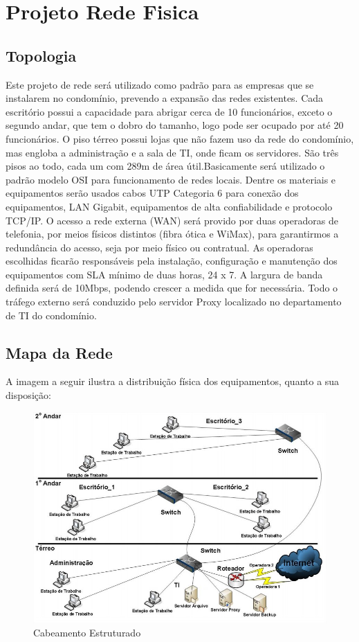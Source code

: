 \documentclass[	DIV=calc,%
							paper=a4,%
							fontsize=12pt,%
							onecolumn]{scrartcl}	 					%
\begin{document}
\section{Projeto Rede Fisica}
\subsection{Topologia}
{\raggedright Este projeto de rede será utilizado como padrão para as empresas que se instalarem no condomínio, prevendo a expansão das redes existentes. Cada escritório possui a capacidade para abrigar cerca de 10 funcionários, exceto o segundo andar, que tem o dobro do tamanho, logo pode ser ocupado por até 20 funcionários. O piso térreo possui lojas que não fazem uso da rede do condomínio, mas engloba a administração e a sala de TI, onde ficam os servidores. São três pisos ao todo, cada um com 289m de área útil.Basicamente será utilizado o padrão modelo OSI para funcionamento de redes locais. Dentre
os materiais e equipamentos serão usados cabos UTP Categoria 6 para conexão dos equipamentos, LAN Gigabit, equipamentos de alta confiabilidade e protocolo TCP/IP. O acesso a rede externa (WAN) será provido por duas operadoras de telefonia, por meios físicos distintos (fibra ótica e WiMax), para garantirmos a redundância do acesso, seja por meio físico ou contratual. As operadoras escolhidas ficarão responsáveis pela instalação, configuração e manutenção dos equipamentos com SLA mínimo de duas horas, 24 x 7. A largura de banda definida será de 10Mbps, podendo crescer a medida que for necessária. Todo o tráfego externo será conduzido pelo servidor Proxy localizado no departamento de TI do condomínio. 
}
\subsection{Mapa da Rede}
{\raggedright A imagem a seguir ilustra a distribuição física dos equipamentos, quanto a sua disposição:  }

\begin{figure}[H]
  \centering
  \includegraphics[width=\textwidth]{mapa_rede} 
  \caption{Cabeamento Estruturado}
  \label{fig:methodology}
\end{figure}
\end{document}
